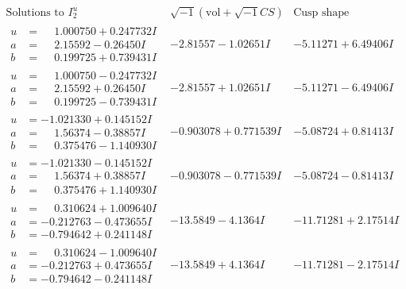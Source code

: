 \documentclass[1p]{elsarticle_modified}
\theoremstyle{definition}
\newcommand{\I}{\sqrt{-1}}
\begin{document}
$$\begin{array}{c|c|c}  
\text{Solutions to }I^u_{2}& \I (\text{vol} + \sqrt{-1}CS) & \text{Cusp shape}\\
 \hline 
\begin{aligned}
u &= \phantom{-}1.000750 + 0.247732 I \\
a &= \phantom{-}2.15592 - 0.26450 I \\
b &= \phantom{-}0.199725 + 0.739431 I\end{aligned}
 & -2.81557 - 1.02651 I & -5.11271 + 6.49406 I \\ \hline\begin{aligned}
u &= \phantom{-}1.000750 - 0.247732 I \\
a &= \phantom{-}2.15592 + 0.26450 I \\
b &= \phantom{-}0.199725 - 0.739431 I\end{aligned}
 & -2.81557 + 1.02651 I & -5.11271 - 6.49406 I \\ \hline\begin{aligned}
u &= -1.021330 + 0.145152 I \\
a &= \phantom{-}1.56374 - 0.38857 I \\
b &= \phantom{-}0.375476 - 1.140930 I\end{aligned}
 & -0.903078 + 0.771539 I & -5.08724 + 0.81413 I \\ \hline\begin{aligned}
u &= -1.021330 - 0.145152 I \\
a &= \phantom{-}1.56374 + 0.38857 I \\
b &= \phantom{-}0.375476 + 1.140930 I\end{aligned}
 & -0.903078 - 0.771539 I & -5.08724 - 0.81413 I \\ \hline\begin{aligned}
u &= \phantom{-}0.310624 + 1.009640 I \\
a &= -0.212763 - 0.473655 I \\
b &= -0.794642 + 0.241148 I\end{aligned}
 & -13.5849 - 4.1364 I & -11.71281 + 2.17514 I \\ \hline\begin{aligned}
u &= \phantom{-}0.310624 - 1.009640 I \\
a &= -0.212763 + 0.473655 I \\
b &= -0.794642 - 0.241148 I\end{aligned}
 & -13.5849 + 4.1364 I & -11.71281 - 2.17514 I \\ \hline\begin{aligned}

\end{aligned}
\end{array}$$
\end{document}
